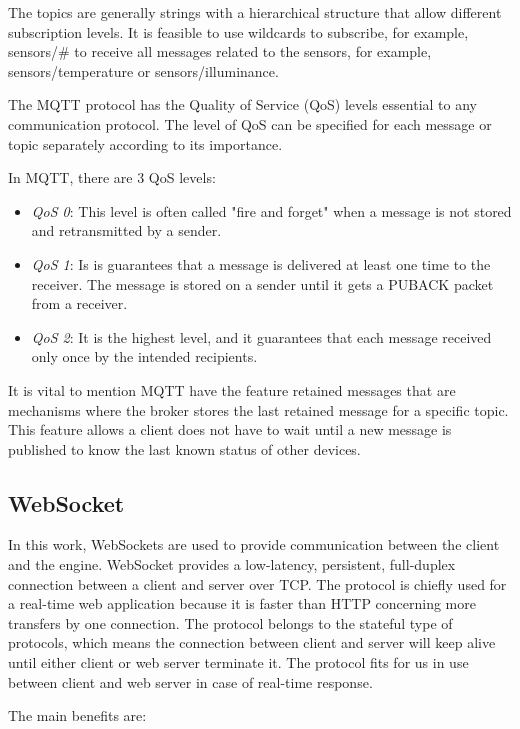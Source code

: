 The topics are generally strings with a hierarchical structure that allow different subscription levels. It is feasible to use wildcards to subscribe, for example, sensors/\# to receive all messages related to the sensors, for example, sensors/temperature or sensors/illuminance.

The MQTT protocol has the Quality of Service (QoS) levels essential to any communication protocol.  The level of QoS can be specified for each message or topic separately according to its importance.

In MQTT, there are 3 QoS levels:

\begin{itemize}
	\item \textit{QoS 0}: This level is often called "fire and forget" when a message is not stored and retransmitted by a sender.
	\item \textit{QoS 1}: Is is guarantees that a message is delivered at least one time to the receiver. The message is stored on a sender until it gets a PUBACK packet from a receiver.
	\item \textit{QoS 2}: It is the highest level, and it guarantees that each message received only once by the intended recipients.
\end{itemize}

It is vital to mention MQTT have the feature retained messages that are mechanisms where the broker stores the last retained message for a specific topic. This feature allows a client does not have to wait until a new message is published to know the last known status of other devices.
 
\subsection{WebSocket}
 
In this work, WebSockets are used to provide communication between the client and the engine. WebSocket provides a low-latency, persistent, full-duplex connection between a client and server over TCP. The protocol is chiefly used for a real-time web application because it is faster than HTTP concerning more transfers by one connection. The protocol belongs to the stateful type of protocols, which means the connection between client and server will keep alive until either client or web server terminate it. The protocol fits for us in use between client and web server in case of real-time response.\citep{websocket_wang_salim_moskovits_2013}

The main benefits are:

